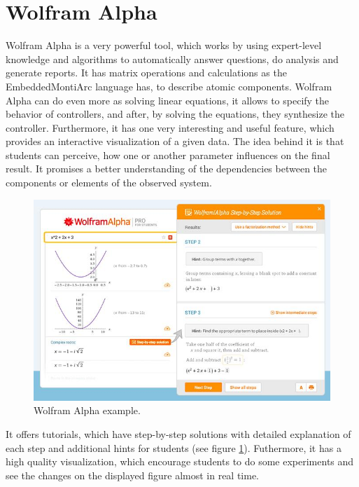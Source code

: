 \section{Wolfram Alpha} \label{sec:wolfram}
Wolfram Alpha \cite{Wolfram} is a very powerful tool, which works by using expert-level knowledge and algorithms to automatically answer questions, do analysis and generate reports. It has matrix operations and calculations as the EmbeddedMontiArc language has, to describe atomic components. Wolfram Alpha can do even more as solving linear equations, it allows to specify the behavior of controllers, and after, by solving the equations, they synthesize the controller. Furthermore, it has one very interesting and useful feature, which provides an interactive visualization of a given data. The idea behind it is that students can perceive, how one or another parameter influences on the final result. It promises a better understanding of the dependencies between the components or elements of the observed system.
\begin{figure}[h!]
    \centering
    \includegraphics[width=0.7\linewidth]{src/pic/wolfram}
    \caption{Wolfram Alpha example.}
    \label{fig:wolfram}
\end{figure}
It offers tutorials, which have step-by-step solutions with detailed explanation of each step and additional hints for students (see figure \ref{fig:wolfram}). Futhermore, it has a high quality visualization, which encourage students to do some experiments and see the changes on the displayed figure almost in real time.

